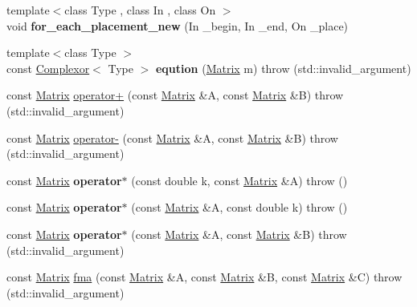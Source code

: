 \begin{DoxyCompactItemize}
{\footnotesize template$<$class Type , class In , class On $>$ }\\void {\bfseries for\+\_\+each\+\_\+placement\+\_\+new} (In \+\_\+begin, In \+\_\+end, On \+\_\+place)
\item 
\mbox{\label{namespacekerbal_1_1math_a1b22f8725b7ea61cb8947511721d357a}} 
{\footnotesize template$<$class Type $>$ }\\const \hyperlink{classkerbal_1_1math_1_1_complexor}{Complexor}$<$ Type $>$ {\bfseries eqution} (\hyperlink{classkerbal_1_1math_1_1_matrix}{Matrix} m)  throw (std\+::invalid\+\_\+argument)
\item 
const \hyperlink{classkerbal_1_1math_1_1_matrix}{Matrix} \hyperlink{namespacekerbal_1_1math_aec1b63008ae51a5c8143fc8919c8cc85}{operator+} (const \hyperlink{classkerbal_1_1math_1_1_matrix}{Matrix} \&A, const \hyperlink{classkerbal_1_1math_1_1_matrix}{Matrix} \&B)  throw (std\+::invalid\+\_\+argument)
\item 
const \hyperlink{classkerbal_1_1math_1_1_matrix}{Matrix} \hyperlink{namespacekerbal_1_1math_a09f875a476dbed33db16b6c5ed8bc4af}{operator-\/} (const \hyperlink{classkerbal_1_1math_1_1_matrix}{Matrix} \&A, const \hyperlink{classkerbal_1_1math_1_1_matrix}{Matrix} \&B)  throw (std\+::invalid\+\_\+argument)
\item 
\mbox{\label{namespacekerbal_1_1math_a75b61b234a6ec8e3873a974ebd9ef8c7}} 
const \hyperlink{classkerbal_1_1math_1_1_matrix}{Matrix} {\bfseries operator$\ast$} (const double k, const \hyperlink{classkerbal_1_1math_1_1_matrix}{Matrix} \&A)  throw ()
\item 
\mbox{\label{namespacekerbal_1_1math_a778d1a072bb4df53afcfbb0a50cb0e3b}} 
const \hyperlink{classkerbal_1_1math_1_1_matrix}{Matrix} {\bfseries operator$\ast$} (const \hyperlink{classkerbal_1_1math_1_1_matrix}{Matrix} \&A, const double k)  throw ()
\item 
\mbox{\label{namespacekerbal_1_1math_a8689fcb60304549f644bb964a5f70627}} 
const \hyperlink{classkerbal_1_1math_1_1_matrix}{Matrix} {\bfseries operator$\ast$} (const \hyperlink{classkerbal_1_1math_1_1_matrix}{Matrix} \&A, const \hyperlink{classkerbal_1_1math_1_1_matrix}{Matrix} \&B)  throw (std\+::invalid\+\_\+argument)
\item 
const \hyperlink{classkerbal_1_1math_1_1_matrix}{Matrix} \hyperlink{namespacekerbal_1_1math_a278eb71f14e9ac59a15b408a4f2ff5bf}{fma} (const \hyperlink{classkerbal_1_1math_1_1_matrix}{Matrix} \&A, const \hyperlink{classkerbal_1_1math_1_1_matrix}{Matrix} \&B, const \hyperlink{classkerbal_1_1math_1_1_matrix}{Matrix} \&C)  throw (std\+::invalid\+\_\+argument)

\end{DoxyCompactItemize}
